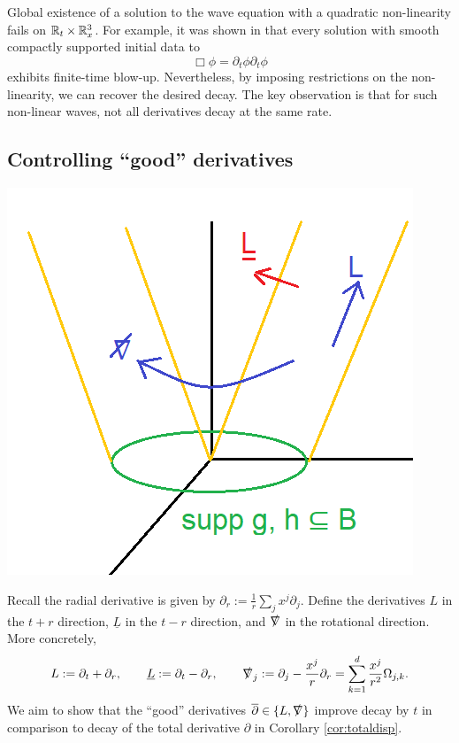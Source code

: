 Global existence of a solution to the wave equation with a quadratic non-linearity fails on $\mathbb R_t \times \mathbb R^3_x$. For example, it was shown in \cite{john1981} that every solution with smooth compactly supported initial data to 
	\[ \Box \phi = \partial_t \phi \partial_t \phi\]
exhibits finite-time blow-up. Nevertheless, by imposing restrictions on the non-linearity, we can recover the desired decay. The key observation is that for such non-linear waves, not all derivatives decay at the same rate.

\subsection{Controlling ``good'' derivatives}

\begin{center}
	\includegraphics[scale = 0.5]{graphics/peeling}
\end{center}
Recall the radial derivative is given by $\partial_r := \frac1r \sum_j x^j \partial_j$. Define the derivatives $L$ in the $t + r$ direction, $\underline L$ in the $t - r$ direction, and $\slashed \nabla$ in the rotational direction. More concretely, 
\begin{align*}
	L
		:= \partial_t + \partial_r, \qquad
	\underline L
		:= \partial_t - \partial_r, \qquad
	\slashed\nabla_j  
		:= \partial_j  - \frac{x^j}{r} \partial_r  = \sum_{k = 1}^d \frac{x^j}{r^2} \Omega_{j, k} .
\end{align*}		
We aim to show that the ``good'' derivatives $\overline \partial \in \{ L, \slashed \nabla \}$ improve decay by $t$ in comparison to decay of the total derivative $\partial$ in Corollary \ref{cor:totaldisp}. 

